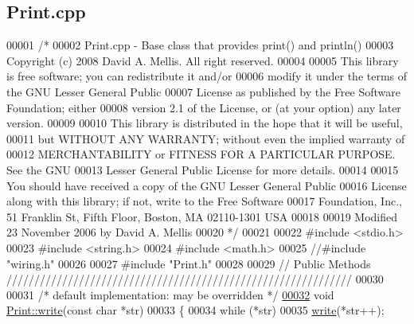 \hypertarget{_print_8cpp_source}{
\subsection{Print.cpp}
}

\begin{DoxyCode}
00001 \textcolor{comment}{/*}
00002 \textcolor{comment}{ Print.cpp - Base class that provides print() and println()}
00003 \textcolor{comment}{ Copyright (c) 2008 David A. Mellis.  All right reserved.}
00004 \textcolor{comment}{ }
00005 \textcolor{comment}{ This library is free software; you can redistribute it and/or}
00006 \textcolor{comment}{ modify it under the terms of the GNU Lesser General Public}
00007 \textcolor{comment}{ License as published by the Free Software Foundation; either}
00008 \textcolor{comment}{ version 2.1 of the License, or (at your option) any later version.}
00009 \textcolor{comment}{ }
00010 \textcolor{comment}{ This library is distributed in the hope that it will be useful,}
00011 \textcolor{comment}{ but WITHOUT ANY WARRANTY; without even the implied warranty of}
00012 \textcolor{comment}{ MERCHANTABILITY or FITNESS FOR A PARTICULAR PURPOSE.  See the GNU}
00013 \textcolor{comment}{ Lesser General Public License for more details.}
00014 \textcolor{comment}{ }
00015 \textcolor{comment}{ You should have received a copy of the GNU Lesser General Public}
00016 \textcolor{comment}{ License along with this library; if not, write to the Free Software}
00017 \textcolor{comment}{ Foundation, Inc., 51 Franklin St, Fifth Floor, Boston, MA  02110-1301  USA}
00018 \textcolor{comment}{ }
00019 \textcolor{comment}{ Modified 23 November 2006 by David A. Mellis}
00020 \textcolor{comment}{ */}
00021 
00022 \textcolor{preprocessor}{#include <stdio.h>}
00023 \textcolor{preprocessor}{#include <string.h>}
00024 \textcolor{preprocessor}{#include <math.h>}
00025 \textcolor{comment}{//#include "wiring.h"}
00026 
00027 \textcolor{preprocessor}{#include "Print.h"}
00028 
00029 \textcolor{comment}{// Public Methods //////////////////////////////////////////////////////////////}
00030 
00031 \textcolor{comment}{/* default implementation: may be overridden */}
\hypertarget{_print_8cpp_source_l00032}{}\hyperlink{class_print_ae083258d224bae2e5d8a27a4f8338880}{00032} \textcolor{keywordtype}{void} \hyperlink{class_print_ad9393033793cfc17f3e37202ba244892}{Print::write}(\textcolor{keyword}{const} \textcolor{keywordtype}{char} *str)
00033 \{
00034   \textcolor{keywordflow}{while} (*str)
00035     \hyperlink{class_print_ad9393033793cfc17f3e37202ba244892}{write}(*str++);

\end{DoxyCode}

